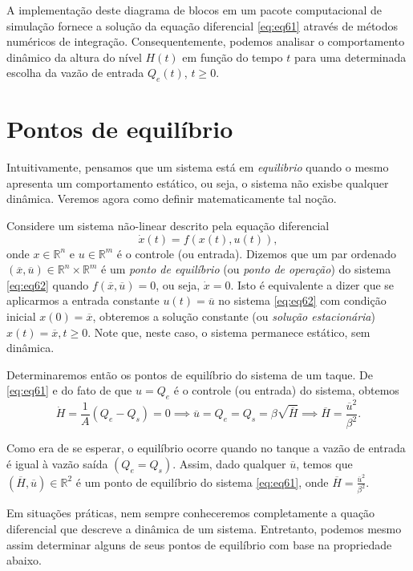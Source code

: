 \documentclass[
]{book}
\theoremstyle{definition}
\theoremstyle{definition}
\theoremstyle{definition}
\theoremstyle{remark}
\begin{document}
A implementação deste diagrama de blocos em um pacote computacional de simulação fornece a solução da equação diferencial \eqref{eq:eq61} através de métodos numéricos de integração. Consequentemente, podemos analisar o comportamento dinâmico da altura do nível \(H(t)\) em função do tempo \(t\) para uma determinada escolha da vazão de entrada \(Q_e(t)\), \(t\geq 0\).

\hypertarget{pontos-de-equiluxedbrio}{%
\section{Pontos de equilíbrio}\label{pontos-de-equiluxedbrio}}

Intuitivamente, pensamos que um sistema está em \emph{equilibrio} quando o mesmo apresenta um comportamento estático, ou seja, o sistema não exisbe qualquer dinâmica. Veremos agora como definir matematicamente tal noção.

Considere um sistema não-linear descrito pela equação diferencial
\[
\dot{x}(t) = f(x(t),u(t)), \label{eq:eq62}
\]
onde \(x \in \mathbb{R}^n\) e \(u \in \mathbb{R}^m\) é o controle (ou entrada). Dizemos que um par ordenado \((\overline{x}, \overline{u}) \in \mathbb{R}^n \times \mathbb{R}^m\) é um \emph{ponto de equilíbrio} (ou \emph{ponto de operação}) do sistema \eqref{eq:eq62} quando \(f(\overline{x}, \overline{u}) =0\), ou seja, \(\dot{x} = 0\). Isto é equivalente a dizer que se aplicarmos a entrada constante \(u(t) = \overline{u}\) no sistema \eqref{eq:eq62} com condição inicial \(x(0) = \overline{x}\), obteremos a solução constante (ou \emph{solução estacionária}) \(x(t) = \overline{x}, t\geq0\). Note que, neste caso, o sistema permanece estático, sem dinâmica.

Determinaremos então os pontos de equilíbrio do sistema de um taque. De \eqref{eq:eq61} e do fato de que \(u = Q_e\) é o controle (ou entrada) do sistema, obtemos
\[
\dot{H} = \frac{1}{A}(Q_e-Q_s)=0 \implies \overline{u} = Q_e = Q_s = \beta\sqrt{\overline{H}} \implies \boxed{\overline{H}=\frac{\overline{u}^2}{\beta^2}}. \label{eq:eq63}
\]

Como era de se esperar, o equilíbrio ocorre quando no tanque a vazão de entrada é igual à vazão saída \((Q_e = Q_s)\). Assim, dado qualquer \(\overline{u}\), temos que \((\overline{H}, \overline{u}) \in \mathbb{R}^2\) é um ponto de equilíbrio do sistema \eqref{eq:eq61}, onde \(\overline{H} = \frac{\overline{u}^2}{\beta^2}\).

Em situações práticas, nem sempre conheceremos completamente a quação diferencial que descreve a dinâmica de um sistema. Entretanto, podemos mesmo assim determinar alguns de seus pontos de equilíbrio com base na propriedade abaixo.
\end{document}
